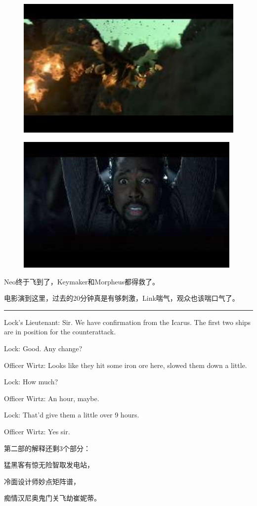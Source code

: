 \documentclass{ctexart}
\newcommand{\myparsep}{\noindent \rule[0.5ex]{\linewidth}{1pt}}
\newenvironment{myquote}{\color{green} \setlength{\leftskip}{6em} \setlength{\rightskip}{4em} \setlength{\parindent}{-2em}}{\par}
\begin{document}
\begin{figure}[htb]
\centering
\includegraphics[width=0.5\linewidth]{fig/read_reloaded-141}
\end{figure}

\begin{figure}[htb]
\centering
\includegraphics[width=0.5\linewidth]{fig/read_reloaded-142}
\end{figure}

Neo终于飞到了，Keymaker和Morpheus都得救了。

电影演到这里，过去的20分钟真是有够刺激，Link喘气，观众也该喘口气了。

\myparsep

\begin{myquote}
Lock's Lieutenant: Sir. We have confirmation from the Icarus. The first two ships are in position for the counterattack.

Lock: Good. Any change?

Officer Wirtz: Looks like they hit some iron ore here, slowed them down a little.

Lock: How much?

Officer Wirtz: An hour, maybe.

Lock: That'd give them a little over 9 hours.

Officer Wirtz: Yes sir.
\end{myquote}

第二部的解释还剩3个部分：

{\centering \it

猛黑客有惊无险智取发电站，

冷面设计师妙点矩阵谱，

痴情汉尼奥鬼门关飞劫崔妮蒂。

}
\end{document}
